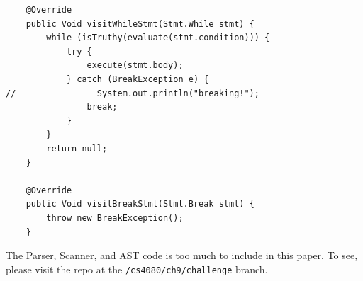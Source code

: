 \documentclass{article}
\begin{document}
\begin{enumerate}
{        \begin{verbatim}
    @Override
    public Void visitWhileStmt(Stmt.While stmt) {
        while (isTruthy(evaluate(stmt.condition))) {
            try {
                execute(stmt.body);
            } catch (BreakException e) {
//                System.out.println("breaking!");
                break;
            }
        }
        return null;
    }

    @Override
    public Void visitBreakStmt(Stmt.Break stmt) {
        throw new BreakException();
    }
        \end{verbatim}

        The Parser, Scanner, and AST code is too much to include in this paper.
        To see, please visit the repo at the \verb|/cs4080/ch9/challenge| branch.
    }
\end{enumerate}
\end{document}
